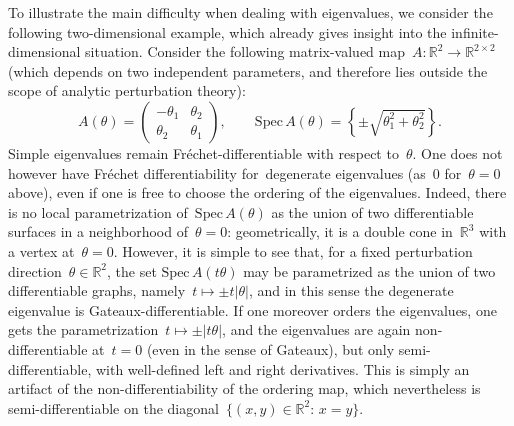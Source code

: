 \documentclass[a4]{article}
\newcommand{\R}{\mathbb{R}}
\newcommand{\1}{\mathbbm 1}
\begin{document}
        To illustrate the main difficulty when dealing with eigenvalues, we consider the following two-dimensional example, which already gives insight into the infinite-dimensional situation.
        Consider the following matrix-valued map~$A:\R^2\to\R^{2\times 2}$ (which depends on two independent parameters, and therefore lies outside the scope of analytic perturbation theory): 
        $$A(\theta) = \begin{pmatrix}
            -\theta_1& \theta_2\\ \theta_2& \theta_1
        \end{pmatrix},\qquad \mathrm{Spec}\,A(\theta) = \left\{\pm \sqrt{\theta_1^2+\theta_2^2}\right\}.$$
        Simple eigenvalues remain Fréchet-differentiable with respect to~$\theta$.
        One does not however have Fréchet differentiability for~degenerate eigenvalues (as~$0$ for~$\theta=0$ above), even if one is free to choose the ordering of the eigenvalues. Indeed, there is no local parametrization of~$\mathrm{Spec}\,A(\theta)$ as the union of two differentiable surfaces in a neighborhood of~$\theta=0$: geometrically, it is a double cone in~$\R^3$ with a vertex at~$\theta=0$.  However, it is simple to see that, for a fixed perturbation direction~$\theta\in \R^2$, the set $\mathrm{Spec}\,A(t\theta)$ may be parametrized as the union of two differentiable graphs, namely~$t\mapsto \pm t|\theta|$, and in this sense the degenerate eigenvalue is Gateaux-differentiable.
        If one moreover orders the eigenvalues, one gets the parametrization~$t\mapsto \pm|t\theta|$, and the eigenvalues are again non-differentiable at~$t=0$ (even in the sense of Gateaux), but only semi-differentiable, with well-defined left and right derivatives. This is simply an artifact of the non-differentiability of the ordering map, which nevertheless is semi-differentiable on the diagonal~$\{(x,y)\in \R^2:\, x=y\}$.
        
\end{document}
